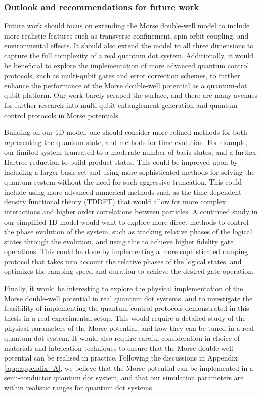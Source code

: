 \documentclass{subfiles}
\begin{document}
\subsubsection*{Outlook and recommendations for future work}
Future work should focus on extending the Morse double-well model to include more realistic features such as transverse confinement, spin-orbit coupling, and environmental effects. It should also extend the model to all three dimensions to capture the full complexity of a real quantum dot system. Additionally, it would be beneficial to explore the implementation of more advanced quantum control protocols, such as multi-qubit gates and error correction schemes, to further enhance the performance of the Morse double-well potential as a quantum-dot qubit platform. Our work barely scraped the surface, and there are many avenues for further research into multi-qubit entanglement generation and quantum control protocols in Morse potentials. 

Building on our 1D model, one should consider more refined methods for both representing the quantum state, and methods for time evolution. For example, our limited system truncated to a moderate number of basis states, and a further Hartree reduction to build product states. This could be improved upon by including a larger basis set and using more sophisticated methods for solving the quantum system without the need for such aggressive truncation. This could include using more advanced numerical methods such as the time-dependent density functional theory (TDDFT) that would allow for more complex interactions and higher order correlations between particles. A continued study in our simplified 1D model would want to explore more direct methods to control the phase evolution of the system, such as tracking relative phases of the logical states through the evolution, and using this to achieve higher fidelity gate operations. This could be done by implementing a more sophisticated ramping protocol that takes into account the relative phases of the logical states, and optimizes the ramping speed and duration to achieve the desired gate operation.

Finally, it would be interesting to explore the physical implementation of the Morse double-well potential in real quantum dot systems, and to investigate the feasibility of implementing the quantum control protocols demonstrated in this thesis in a real experimental setup. This would require a detailed study of the physical parameters of the Morse potential, and how they can be tuned in a real quantum dot system. It would also require careful consideration in choice of materials and fabrication techniques to ensure that the Morse double-well potential can be realised in practice. Following the discussions in Appendix \ref{app:appendix_A}, we believe that the Morse potential can be implemented in a semi-conductor quantum dot system, and that our simulation parameters are within realistic ranges for quantum dot systems.
\end{document}
